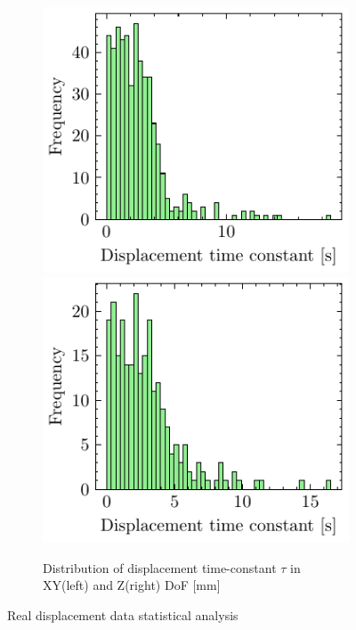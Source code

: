 \begin{figure}
    \begin{subfigure}{\linewidth}
    \includegraphics[width=.5\linewidth]{images/fig_chapter4/data_dist/5.pdf}\hfill
    \includegraphics[width=.5\linewidth]{images/fig_chapter4/data_dist/6.pdf}
    \caption{Distribution of displacement time-constant $ \tau $ in XY(left) and Z(right) DoF [mm]}
    \end{subfigure}
\caption{Real displacement data statistical analysis}
\label{fig:dist_disp}
\end{figure}

